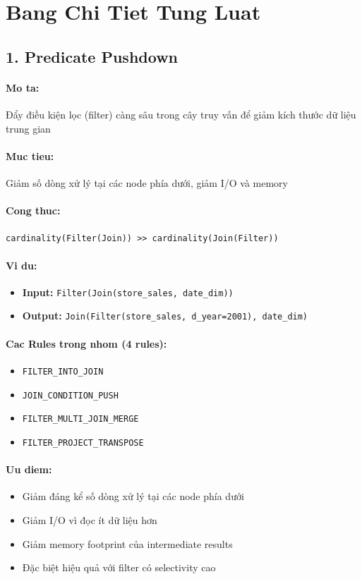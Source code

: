 \section{Bang Chi Tiet Tung Luat}

\subsection*{\bfseries 1. Predicate Pushdown}
\paragraph{Mo ta:} Đẩy điều kiện lọc (filter) càng sâu trong cây truy vấn để giảm kích thước dữ liệu trung gian
\paragraph{Muc tieu:} Giảm số dòng xử lý tại các node phía dưới, giảm I/O và memory
\paragraph{Cong thuc:} \texttt{cardinality(Filter(Join)) >> cardinality(Join(Filter))}
\paragraph{Vi du:}
\begin{itemize}
\item \textbf{Input:} \texttt{Filter(Join(store_sales, date_dim))}
\item \textbf{Output:} \texttt{Join(Filter(store_sales, d_year=2001), date_dim)}
\end{itemize}
\paragraph{Cac Rules trong nhom (4 rules):}
\begin{itemize}
\item \texttt{FILTER_INTO_JOIN}
\item \texttt{JOIN_CONDITION_PUSH}
\item \texttt{FILTER_MULTI_JOIN_MERGE}
\item \texttt{FILTER_PROJECT_TRANSPOSE}
\end{itemize}
\paragraph{Uu diem:}
\begin{itemize}
\item Giảm đáng kể số dòng xử lý tại các node phía dưới
\item Giảm I/O vì đọc ít dữ liệu hơn
\item Giảm memory footprint của intermediate results
\item Đặc biệt hiệu quả với filter có selectivity cao
\end{itemize}

